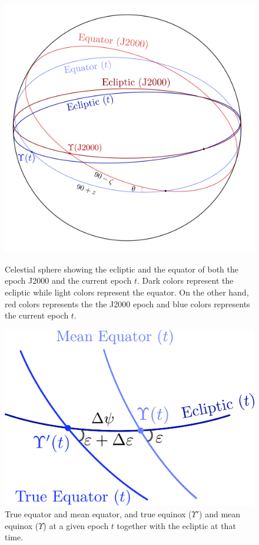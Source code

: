 \documentclass[../main.tex]{subfiles}
\begin{document}
\begin{figure}[htbp]
  \centering
  \begin{minipage}[t]{0.45\textwidth}
    \centering
    \includegraphics[width=\textwidth]{Images/ecliptic_equator.pdf}
    \caption{Celestial sphere showing the ecliptic and the equator of both the epoch J2000 and the current epoch $t$. Dark colors represent the ecliptic while light colors represent the equator. On the other hand, red colors represents the the J2000 epoch and blue colors represents the current epoch $t$.}
    \label{fig:precession_matrix}
  \end{minipage}
  \hfill
  \begin{minipage}[t]{0.45\textwidth}
    \centering
    \includegraphics[width=\textwidth]{Images/nutation_matrix.pdf}
    \caption{True equator and mean equator, and true equinox ($\Upsilon'$) and mean equinox ($\Upsilon$) at a given epoch $t$ together with the ecliptic at that time.}
    \label{fig:nutation_matrix}
  \end{minipage}
\end{figure}
\end{document}
